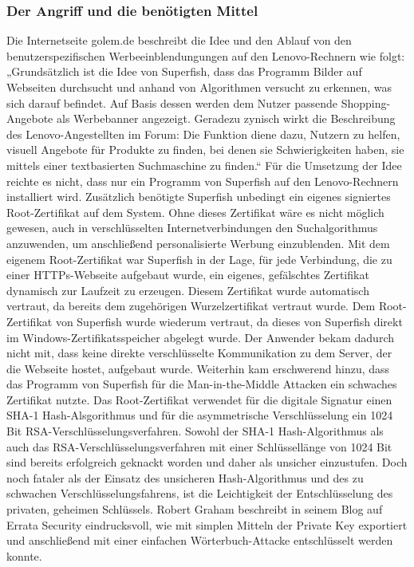 \subsubsection{Der Angriff und die benötigten Mittel}
Die Internetseite golem.de beschreibt die Idee und den Ablauf von den benutzerspezifischen Werbeeinblendungungen auf den Lenovo-Rechnern wie folgt: „Grundsätzlich ist die Idee von Superfish, dass das Programm Bilder auf Webseiten durchsucht und anhand von Algorithmen versucht zu erkennen, was sich darauf befindet. Auf Basis dessen werden dem Nutzer passende Shopping-Angebote als Werbebanner angezeigt. Geradezu zynisch wirkt die Beschreibung des Lenovo-Angestellten im Forum: Die Funktion diene dazu, Nutzern zu helfen, visuell Angebote für Produkte zu finden, bei denen sie Schwierigkeiten haben, sie mittels einer textbasierten Suchmaschine zu finden.“\cite{superfish}
Für die Umsetzung der Idee reichte es nicht, dass nur ein Programm von Superfish auf den Lenovo-Rechnern installiert wird. Zusätzlich benötigte Superfish unbedingt ein eigenes signiertes Root-Zertifikat auf dem System. Ohne dieses Zertifikat wäre es nicht möglich gewesen, auch in verschlüsselten Internetverbindungen den Suchalgorithmus anzuwenden, um anschließend personalisierte Werbung einzublenden. Mit dem eigenem Root-Zertifikat war Superfish in der Lage, für jede Verbindung, die zu einer HTTPs-Webseite aufgebaut wurde, ein eigenes, gefälschtes Zertifikat dynamisch zur Laufzeit zu erzeugen. Diesem Zertifikat wurde automatisch vertraut, da bereits dem zugehörigen Wurzelzertifikat vertraut wurde. Dem Root-Zertifikat von Superfish wurde wiederum vertraut, da dieses von Superfish direkt im Windows-Zertifikatsspeicher abgelegt wurde. Der Anwender bekam dadurch nicht mit, dass keine direkte verschlüsselte Kommunikation zu dem Server, der die Webseite hostet, aufgebaut wurde. %
Weiterhin kam erschwerend hinzu, dass das Programm von Superfish für die Man-in-the-Middle Attacken ein schwaches Zertifikat nutzte. Das Root-Zertifikat verwendet für die digitale Signatur einen SHA-1 Hash-Alsgorithmus und für die asymmetrische Verschlüsselung ein 1024 Bit RSA-Verschlüsselungsverfahren. Sowohl der SHA-1 Hash-Algorithmus als auch das RSA-Verschlüsselungsverfahren mit einer Schlüssellänge von 1024 Bit sind bereits erfolgreich geknackt worden und daher als unsicher einzustufen. 
Doch noch fataler als der Einsatz des unsicheren Hash-Algorithmus und des zu schwachen Verschlüsselungsfahrens, ist die Leichtigkeit der Entschlüsselung des privaten, geheimen Schlüssels. Robert Graham beschreibt in seinem Blog auf Errata Security eindrucksvoll, wie mit simplen Mitteln der Private Key exportiert und anschließend mit einer einfachen Wörterbuch-Attacke entschlüsselt werden konnte. \cite[vgl.]{certificate_ex}
